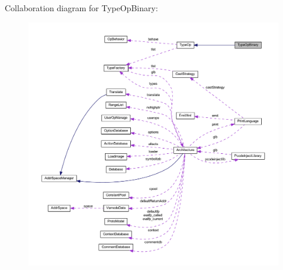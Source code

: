 Collaboration diagram for Type\+Op\+Binary\+:
\nopagebreak
\begin{figure}[H]
\begin{center}
\leavevmode
\includegraphics[width=350pt]{class_type_op_binary__coll__graph}
\end{center}
\end{figure}
